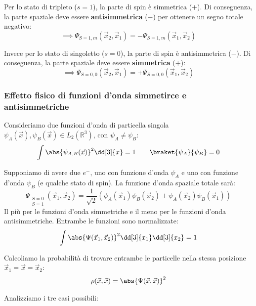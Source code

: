 Per lo stato di tripleto (\(s=1\)), la parte di spin è simmetrica ($+$). Di conseguenza, la parte spaziale deve essere \textbf{antisimmetrica} ($-$) per ottenere un segno totale negativo:
\[
    \implies \Psi_{S=1, m}(\vec{x}_2, \vec{x}_1) = - \Psi_{S=1, m}(\vec{x}_1, \vec{x}_2)
\]

Invece per lo stato di singoletto (\(s=0\)), la parte di spin è antisimmetrica ($-$). Di conseguenza, la parte spaziale deve essere \textbf{simmetrica} ($+$):
\[
    \implies \Psi_{S=0, 0}(\vec{x}_2, \vec{x}_1) = + \Psi_{S=0, 0}(\vec{x}_1, \vec{x}_2)
\]

\subsubsection{Effetto fisico di funzioni d'onda simmetirce e antisimmetriche}

Consideriamo due funzioni d'onda di particella singola \(\psi_A(\vec{x}), \psi_B(\vec{x}) \in L_2(\mathbb{R}^3)\), con \(\psi_A \neq \psi_B\):
\begin{equation}
    \int \abs{\psi_{A,B}(\vec{x})}^2 \dd[3]{x} = 1 \qquad \braket{\psi_A}{\psi_B} = 0
\end{equation}

Supponiamo di avere due \(e^-\), uno con funzione d'onda \(\psi_A\) e uno con funzione d'onda \(\psi_B\) (e qualche stato di spin). 
La funzione d'onda spaziale totale sarà:
\begin{equation}
    \Psi_{\substack{S=0 \\ S=1}} (\vec{x}_1, \vec{x}_2) = \frac{1}{\sqrt{2}} \left( \psi_A(\vec{x}_1) \psi_B(\vec{x}_2) \pm \psi_A(\vec{x}_2) \psi_B(\vec{x}_1) \right)
\end{equation}
Il più per le funzioni d'onda simmetriche e il meno per le funzioni d'onda antisimmetriche. Entrambe le funzioni sono normalizzate:
\[
    \int \abs{\Psi(\vec{x}_1, \vec{x}_2)}^2 \dd[3]{x_1} \dd[3]{x_2} = 1
\]

Calcoliamo la probabilità di trovare entrambe le particelle nella stessa posizione \(\vec{x}_1 = \vec{x} = \vec{x}_2\):
\begin{equation}
    \rho(\vec{x}, \vec{x}) = \abs{\Psi(\vec{x}, \vec{x})}^2
\end{equation}

Analizziamo i tre casi possibili:

